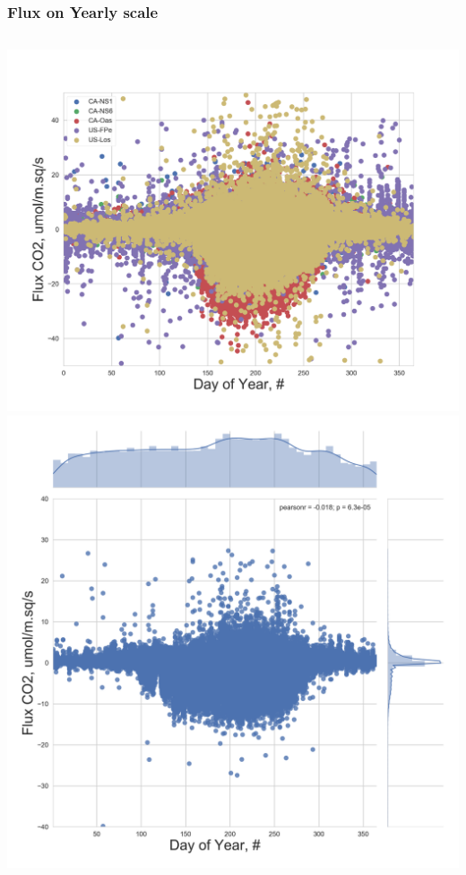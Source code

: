\documentclass{beamer}
\begin{document}
\begin{frame}
\frametitle{Flux on Yearly scale}

\begin{columns}[t]
\centering
\includegraphics[width=\textwidth]{FvsY/all.png}\\
\includegraphics[width=\textwidth]{FvsY/CA-NS1.png}
\centering

\end{columns}
\end{frame}
\end{document}
